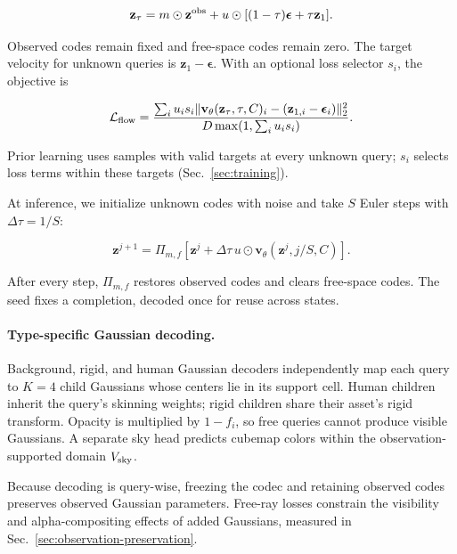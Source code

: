 \begin{equation}
\mathbf z_\tau=m\odot\mathbf z^{\rm obs}
+u\odot[(1-\tau)\boldsymbol\epsilon+\tau\mathbf z_1].
\label{eq:flow-path}
\end{equation}

Observed codes remain fixed and free-space codes remain zero. The target velocity for unknown queries is $\mathbf z_1-\boldsymbol\epsilon$. With an optional loss selector $s_i$, the objective is

\begin{equation}
\mathcal L_{\rm flow}=
\frac{\sum_i u_i s_i\|\mathbf v_\theta(\mathbf z_\tau,\tau,C)_i
-(\mathbf z_{1,i}-\boldsymbol\epsilon_i)\|_2^2}
{D\max(1,\sum_i u_i s_i)}.
\label{eq:flow-loss}
\end{equation}

Prior learning uses samples with valid targets at every unknown query; $s_i$ selects loss terms within these targets (Sec.~\ref{sec:training}).

At inference, we initialize unknown codes with noise and take $S$ Euler steps with $\Delta\tau=1/S$:

\begin{equation}
\mathbf z^{j+1}=\Pi_{m,f}\!\left[
\mathbf z^j+\Delta\tau\,u\odot
\mathbf v_\theta(\mathbf z^j,j/S,C)\right].
\label{eq:sampling}
\end{equation}

After every step, $\Pi_{m,f}$ restores observed codes and clears free-space codes. The seed fixes a completion, decoded once for reuse across states.

\paragraph{Type-specific Gaussian decoding.}
\label{sec:decoding}

Background, rigid, and human Gaussian decoders independently map each query to $K=4$ child Gaussians whose centers lie in its support cell. Human children inherit the query's skinning weights; rigid children share their asset's rigid transform. Opacity is multiplied by $1-f_i$, so free queries cannot produce visible Gaussians. A separate sky head predicts cubemap colors within the observation-supported domain $V_{\rm sky}$.

Because decoding is query-wise, freezing the codec and retaining observed codes preserves observed Gaussian parameters. Free-ray losses constrain the visibility and alpha-compositing effects of added Gaussians, measured in Sec.~\ref{sec:observation-preservation}.

